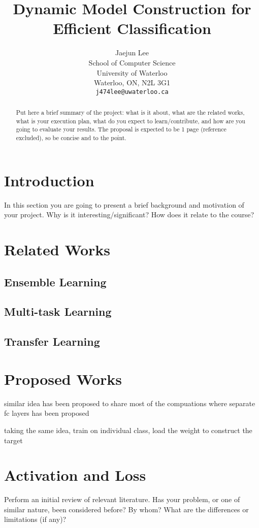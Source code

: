 \documentclass{article}
\title{Dynamic Model Construction for Efficient Classification}
\author{
	Jaejun Lee \\
	School of Computer Science\\
	University of Waterloo\\
	Waterloo, ON, N2L 3G1 \\
	\texttt{j474lee@uwaterloo.ca} \\
}
\begin{document}
\maketitle

\begin{abstract} 
Put here a brief summary of the project: what is it about, what are the related works, what is your execution plan, what do you expect to learn/contribute, and how are you going to evaluate your results. The proposal is expected to be 1 page (reference excluded), so be concise and to the point.
\end{abstract} 

\section{Introduction}
In this section you are going to present a brief background and motivation of your project. Why is it interesting/significant? How does it relate to the course?

\section{Related Works}

\subsection{Ensemble Learning}

\subsection{Multi-task Learning}

\subsection{Transfer Learning}

\section{Proposed Works}

similar idea has been proposed to share most of the compuations where separate fc layers has been proposed

taking the same idea, train on individual class, load the weight to construct the target



\section{Activation and Loss}
Perform an initial review of relevant literature. Has your problem, or one of similar nature, been considered before? By whom? What are the differences or limitations (if any)?
\end{document}
